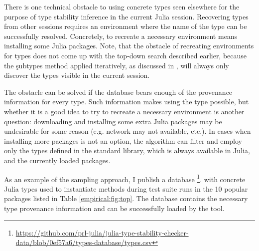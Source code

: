 There is one technical obstacle to using concrete types seen elsewhere for the purpose
of type stability inference in the current Julia session. Recovering types from
other sessions requires an environment where the name of the type can be
successfully resolved. Concretely, to recreate a necessary environment means
installing some Julia packages.
Note, that the obstacle of recreating environments for types does not come up
with the top-down search described earlier, because the \c{subtypes} method
applied iteratively, as discussed in , will always only
discover the types visible in the current session.

The obstacle can be solved if the database bears enough
of the provenance information for every type. Such information makes using the
type possible, but whether it is a good idea to try to recreate a necessary
environment is another question: downloading and
installing some extra Julia packages may be undesirable for some reason (e.g.
network may not available, etc.). In cases when installing more packages is not
an option, the algorithm can filter and
employ only the types defined in the standard library, which is always available
in Julia, and the currently loaded packages.

As an example of the sampling approach, I publish a database
\footnote{%
  \url{https://github.com/prl-julia/julia-type-stability-checker-data/blob/0ef57a6/types-database/types.csv}}.
with concrete Julia types used to instantiate methods during test suite runs in
the 10 popular packages listed in Table \ref{empirical:fig:top}. The database
contains the necessary type provenance information and can be successfully
loaded by the tool.



